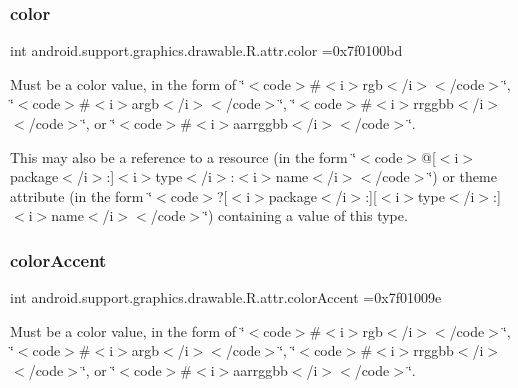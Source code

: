 \subsubsection{\texorpdfstring{color}{color}}
{\footnotesize\ttfamily int android.\+support.\+graphics.\+drawable.\+R.\+attr.\+color =0x7f0100bd\hspace{0.3cm}{\ttfamily [static]}}

Must be a color value, in the form of \char`\"{}$<$code$>$\#$<$i$>$rgb$<$/i$>$$<$/code$>$\char`\"{}, \char`\"{}$<$code$>$\#$<$i$>$argb$<$/i$>$$<$/code$>$\char`\"{}, \char`\"{}$<$code$>$\#$<$i$>$rrggbb$<$/i$>$$<$/code$>$\char`\"{}, or \char`\"{}$<$code$>$\#$<$i$>$aarrggbb$<$/i$>$$<$/code$>$\char`\"{}. 

This may also be a reference to a resource (in the form \char`\"{}$<$code$>$@\mbox{[}$<$i$>$package$<$/i$>$\+:\mbox{]}$<$i$>$type$<$/i$>$\+:$<$i$>$name$<$/i$>$$<$/code$>$\char`\"{}) or theme attribute (in the form \char`\"{}$<$code$>$?\mbox{[}$<$i$>$package$<$/i$>$\+:\mbox{]}\mbox{[}$<$i$>$type$<$/i$>$\+:\mbox{]}$<$i$>$name$<$/i$>$$<$/code$>$\char`\"{}) containing a value of this type. \mbox{\label{classandroid_1_1support_1_1graphics_1_1drawable_1_1R_1_1attr_a4e550a3c72e4b6094e8f70f2d5f4fc85}} 
\subsubsection{\texorpdfstring{color\+Accent}{colorAccent}}
{\footnotesize\ttfamily int android.\+support.\+graphics.\+drawable.\+R.\+attr.\+color\+Accent =0x7f01009e\hspace{0.3cm}{\ttfamily [static]}}

Must be a color value, in the form of \char`\"{}$<$code$>$\#$<$i$>$rgb$<$/i$>$$<$/code$>$\char`\"{}, \char`\"{}$<$code$>$\#$<$i$>$argb$<$/i$>$$<$/code$>$\char`\"{}, \char`\"{}$<$code$>$\#$<$i$>$rrggbb$<$/i$>$$<$/code$>$\char`\"{}, or \char`\"{}$<$code$>$\#$<$i$>$aarrggbb$<$/i$>$$<$/code$>$\char`\"{}. 

